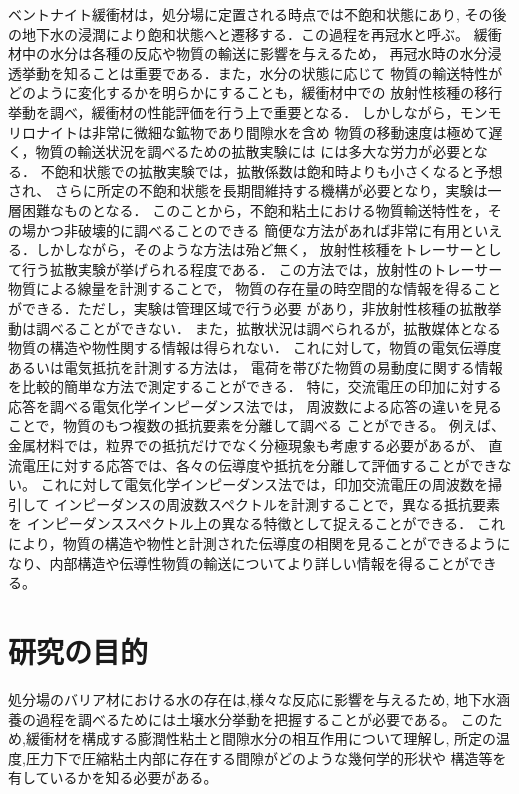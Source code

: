ベントナイト緩衝材は，処分場に定置される時点では不飽和状態にあり,
その後の地下水の浸潤により飽和状態へと遷移する．この過程を再冠水と呼ぶ。
緩衝材中の水分は各種の反応や物質の輸送に影響を与えるため，
再冠水時の水分浸透挙動を知ることは重要である．また，水分の状態に応じて
物質の輸送特性がどのように変化するかを明らかにすることも，緩衝材中での
放射性核種の移行挙動を調べ，緩衝材の性能評価を行う上で重要となる．
しかしながら，モンモリロナイトは非常に微細な鉱物であり間隙水を含め
物質の移動速度は極めて遅く，物質の輸送状況を調べるための拡散実験には
には多大な労力が必要となる．
不飽和状態での拡散実験では，拡散係数は飽和時よりも小さくなると予想され、
さらに所定の不飽和状態を長期間維持する機構が必要となり，実験は一層困難なものとなる．
このことから，不飽和粘土における物質輸送特性を，その場かつ非破壊的に調べることのできる
簡便な方法があれば非常に有用といえる．しかしながら，そのような方法は殆ど無く，
放射性核種をトレーサーとして行う拡散実験が挙げられる程度である．
この方法では，放射性のトレーサー物質による線量を計測することで，
物質の存在量の時空間的な情報を得ることができる．ただし，実験は管理区域で行う必要
があり，非放射性核種の拡散挙動は調べることができない．
また，拡散状況は調べられるが，拡散媒体となる物質の構造や物性関する情報は得られない．
これに対して，物質の電気伝導度あるいは電気抵抗を計測する方法は，
電荷を帯びた物質の易動度に関する情報を比較的簡単な方法で測定することができる．
特に，交流電圧の印加に対する応答を調べる電気化学インピーダンス法では，
周波数による応答の違いを見ることで，物質のもつ複数の抵抗要素を分離して調べる
ことができる。
例えば、金属材料では，粒界での抵抗だけでなく分極現象も考慮する必要があるが、
直流電圧に対する応答では、各々の伝導度や抵抗を分離して評価することができない。
これに対して電気化学インピーダンス法では，印加交流電圧の周波数を掃引して
インピーダンスの周波数スペクトルを計測することで，異なる抵抗要素を
インピーダンススペクトル上の異なる特徴として捉えることができる．
これにより，物質の構造や物性と計測された伝導度の相関を見ることができるように
なり、内部構造や伝導性物質の輸送についてより詳しい情報を得ることができる。
\section{研究の目的}


処分場のバリア材における水の存在は,様々な反応に影響を与えるため,
地下水涵養の過程を調べるためには土壌水分挙動を把握することが必要である。
このため,緩衝材を構成する膨潤性粘土と間隙水分の相互作用について理解し,
所定の温度,圧力下で圧縮粘土内部に存在する間隙がどのような幾何学的形状や
構造等を有しているかを知る必要がある。

